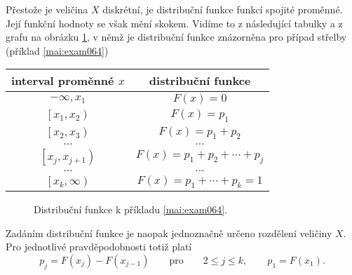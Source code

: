 
    Přestože je veličina \(X\) diskrétní, je distribuční funkce funkcí spojité proměnné. Její 
    funkční hodnoty se však mění skokem. Vidíme to z následující tabulky a z grafu na obrázku 
    \ref{mai:fig045}, v němž je distribuční funkce znázorněna pro případ střelby (příklad 
    \ref{mai:exam064})

    \begin{table}[ht!]
      \centering
      \begin{tabular}{c|c}
        \textbf{interval proměnné} \(x\)  &  \textbf{distribuční funkce}             \\ \hline
            \(-\infty, x_1\)              &    \(F(x) = 0 \)                         \\
            \(\left[x_1, x_2\right)\)     &    \(F(x) = p_1 \)                       \\
            \(\left[x_2, x_3\right)\)     &    \(F(x) = p_1 + p_2 \)                 \\
                    \(\ldots\)            &       \(\ldots\)                         \\
            \(\left[x_j, x_{j+1}\right)\) &    \(F(x) = p_1 + p_2 + \cdots + p_j \)  \\
                   \(\ldots\)             &       \(\ldots\)                         \\
            \(\left[x_k, \infty\right)\)  &    \(F(x) = p_1 + \cdots + p_k =1 \)     \\ \hline
            \end{tabular}
    \end{table}

    \begin{figure}[ht!] %
      \centering
      \caption{Distribuční funkce k příkladu \ref{mai:exam064}. \cite[s.~233]{Musilova2009MA1}}
      \label{mai:fig045}
    \end{figure}
    Zadáním distribuční funkce je naopak jednoznačně určeno rozdělení veličiny \(X\). Pro jednotlivé
    pravděpodobnosti totiž platí
    \begin{equation*}
      p_j = F(x_j) - F(x_{j-1})\qquad\text{pro}\qquad 2\leq j \leq k, \qquad p_1 = F(x_1).
    \end{equation*}
    
